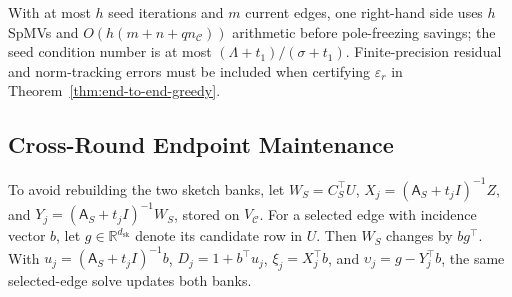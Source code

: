 \documentclass[conference]{IEEEtran}
\theoremstyle{definition}
\newcommand{\dsk}{d_{\mathrm{sk}}}
\newcommand{\matA}{\mathsf A}
\begin{document}
With at most $h$ seed iterations and $m$ current edges, one right-hand
side uses $h$ SpMVs and $O(h(m+n+q n_{\mathcal C}))$ arithmetic before
pole-freezing savings; the seed condition number is at most
$(\Lambda+t_1)/(\sigma+t_1)$. Finite-precision residual and
norm-tracking errors must be included when certifying $\varepsilon_r$
in Theorem~\ref{thm:end-to-end-greedy}.

\subsection{Cross-Round Endpoint Maintenance}
\label{sec:maintenance}

To avoid rebuilding the two sketch banks, let $W_S=C_S^\top U$,
$X_j=(\matA_S+t_jI)^{-1}Z$, and $Y_j=(\matA_S+t_jI)^{-1}W_S$, stored
on $V_{\mathcal C}$. For a selected edge with incidence vector $b$,
let $g\in\mathbb R^{\dsk}$ denote its candidate row in $U$. Then $W_S$
changes by $bg^\top$. With $u_j=(\matA_S+t_jI)^{-1}b$,
$D_j=1+b^\top u_j$, $\xi_j=X_j^\top b$, and $\upsilon_j=g-Y_j^\top b$,
the same selected-edge solve updates both banks.
\end{document}
